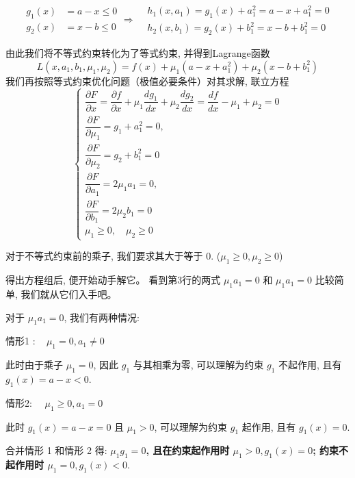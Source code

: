 $$\begin{aligned}
    g_1(x) &= a - x \le 0 \\
    g_2(x) &= x - b \le 0
\end{aligned} \Rightarrow \begin{aligned}
    &h_{1}\left(x, a_{1}\right)=g_{1}(x)+a_{1}^{2}=a-x+a_{1}^{2}=0\\
    &h_{2}\left(x, b_{1}\right)=g_{2}(x)+b_{1}^{2}=x-b+b_{1}^{2}=0
\end{aligned}$$


由此我们将不等式约束转化为了等式约束, 并得到Lagrange函数
$$
L\left(x, a_{1}, b_{1}, \mu_{1}, \mu_{2}\right)=f(x)+\mu_{1}\left(a-x+a_{1}^{2}\right)+\mu_{2}\left(x-b+b_{1}^{2}\right)
$$
我们再按照等式约束优化问题（极值必要条件）对其求解, 联立方程
$$
\left\{\begin{array}{l}
\dfrac{\partial F}{\partial x}=\dfrac{\partial f}{\partial x}+\mu_{1} \dfrac{d g_{1}}{d x}+\mu_{2} \dfrac{d g_{2}}{d x}=\dfrac{d f}{d x}-\mu_{1}+\mu_{2}=0 \\
\dfrac{\partial F}{\partial \mu_{1}}=g_{1}+a_{1}^{2}=0, \\ 
\dfrac{\partial F}{\partial \mu_{2}}=g_{2}+b_{1}^{2}=0 \\
\dfrac{\partial F}{\partial a_{1}}=2 \mu_{1} a_{1}=0, \\ 
\dfrac{\partial F}{\partial b_{1}}=2 \mu_{2} b_{1}=0 \\
\mu_{1} \geq 0, \quad \mu_{2} \geq 0
\end{array}\right.
$$

\begin{remark}
    对于不等式约束前的乘子, 我们要求其大于等于 0. ($\mu_{1} \geq 0, \mu_{2} \geq 0$)
\end{remark}

得出方程组后, 便开始动手解它。 看到第3行的两式 $\mu_{1} a_{1}=0$ 和 $\mu_{1} a_{1}=0$ 比较简单, 我们就从它们入手吧。

对于 $\mu_{1} a_{1}=0$, 我们有两种情况:

情形1 $: \quad \mu_{1}=0, a_{1} \neq 0$

此时由于乘子 $\mu_{1}=0$, 因此 $g_{1}$ 与其相乘为零, 可以理解为约束 $g_{1}$ 不起作用, 且有 $g_{1}(x)=a-x<0 .$

情形2: $\quad \mu_{1} \geq 0, a_{1}=0$

此时 $g_{1}(x)=a-x=0$ 且 $\mu_{1}>0$, 可以理解为约束 $g_{1}$ 起作用, 且有 $g_{1}(x)=0$.

合并情形 1 和情形 2 得: \textbf{$\mu_{1} g_{1}=0$, 且在约束起作用时 $\mu_{1}>0, g_{1}(x)=0$; 约束不起作用时 $\mu_{1}=0, g_{1}(x)<0 .$}

